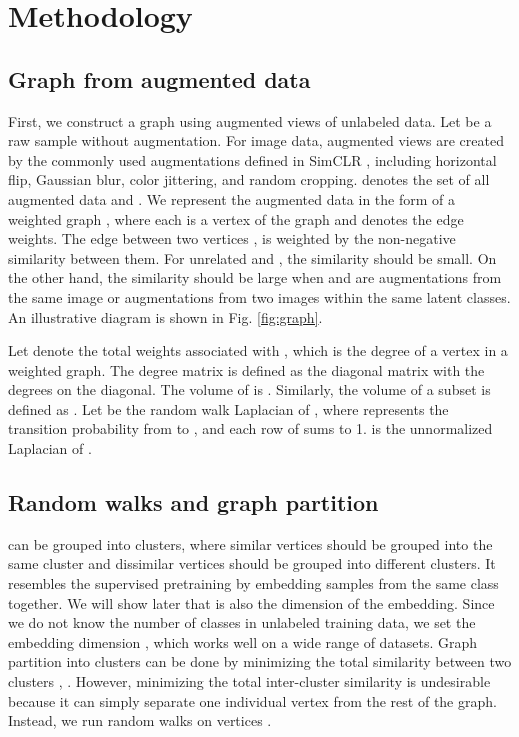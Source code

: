 \documentclass{article}
\begin{document}
\section{Methodology}




\subsection{Graph from augmented data}
First, we construct a graph using augmented views of unlabeled data. Let  be a raw sample without augmentation. For image data, augmented views are created by the commonly used augmentations defined in SimCLR \citep{chen:etal:2020simclr}, including horizontal flip, Gaussian blur, color jittering, and random cropping.  denotes the set of all augmented data and . We represent the augmented data in the form of a weighted graph , where each  is a vertex of the graph and  denotes the edge weights. The edge between two vertices ,  is weighted by the non-negative similarity  between them. For unrelated  and , the similarity  should be small. On the other hand, the similarity  should be large when  and  are augmentations from the same image or augmentations from two images within the same latent classes. An illustrative diagram is shown in Fig. \ref{fig:graph}.

Let  denote the total weights associated with , which is the degree of a vertex  in a weighted graph. The degree matrix  is defined as the diagonal matrix with the degrees  on the diagonal. The volume of  is . Similarly, the volume of a subset  is defined as .  Let  be the random walk Laplacian of , where  represents the transition probability from  to , and each row of  sums to 1.  is the unnormalized Laplacian of .

\subsection{Random walks and graph partition}
 can be grouped into  clusters, where similar vertices should be grouped into the same cluster and dissimilar vertices should be grouped into different clusters. It resembles the supervised pretraining by embedding samples from the same class together. We will show later that  is also the dimension of the embedding. Since we do not know the number of classes in unlabeled training data, we set the embedding dimension , which works well on a wide range of datasets. Graph partition into clusters can be done by minimizing the total similarity  between two clusters , . However, minimizing the total inter-cluster similarity is undesirable because it can simply separate one individual vertex from the rest of the graph. Instead, we run random walks on vertices . 
\end{document}
